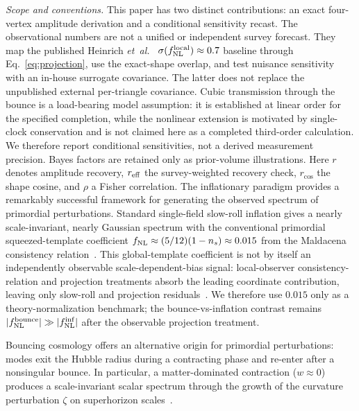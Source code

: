 \documentclass[aps,prd,twocolumn,superscriptaddress,showpacs,preprintnumbers,nofootinbib,longbibliography,floatfix]{revtex4-2}
\newcommand{\fnl}{f_{\rm NL}}
\newcommand{\etal}{\textit{et~al.}}
\begin{document}
\emph{Scope and conventions.} This paper has two distinct contributions: an exact four-vertex amplitude derivation and a conditional sensitivity recast. The observational numbers are not a unified or independent survey forecast. They map the published Heinrich \etal~\cite{Heinrich:2023} $\sigma(\fnl^{\rm local})\approx0.7$ baseline through Eq.~\eqref{eq:projection}, use the exact-shape overlap, and test nuisance sensitivity with an in-house surrogate covariance. The latter does not replace the unpublished external per-triangle covariance. Cubic transmission through the bounce is a load-bearing model assumption: it is established at linear order for the specified completion, while the nonlinear extension is motivated by single-clock conservation and is not claimed here as a completed third-order calculation. We therefore report conditional sensitivities, not a derived measurement precision. Bayes factors are retained only as prior-volume illustrations. Here $r$ denotes amplitude recovery, $r_{\rm eff}$ the survey-weighted recovery check, $r_{\cos}$ the shape cosine, and $\rho$ a Fisher correlation.
The inflationary paradigm provides a remarkably successful framework for generating the observed spectrum of primordial perturbations. Standard single-field slow-roll inflation gives a nearly scale-invariant, nearly Gaussian spectrum with the conventional primordial squeezed-template coefficient $\fnl \approx (5/12)(1-n_s) \approx 0.015$ from the Maldacena consistency relation~\cite{Maldacena:2002vr}. This global-template coefficient is not by itself an independently observable scale-dependent-bias signal: local-observer consistency-relation and projection treatments absorb the leading coordinate contribution, leaving only slow-roll and projection residuals~\cite{Pajer:2013,TanakaUrakawa:2011}. We therefore use $0.015$ only as a theory-normalization benchmark; the bounce-vs-inflation contrast remains $|\fnl^{\rm bounce}| \gg |\fnl^{\rm inf}|$ after the observable projection treatment.

Bouncing cosmology offers an alternative origin for primordial perturbations: modes exit the Hubble radius during a contracting phase and re-enter after a nonsingular bounce. In particular, a matter-dominated contraction ($w \approx 0$) produces a scale-invariant scalar spectrum through the growth of the curvature perturbation $\zeta$ on superhorizon scales~\cite{Wands:1998yp,Finelli:2001sr}.
\end{document}
